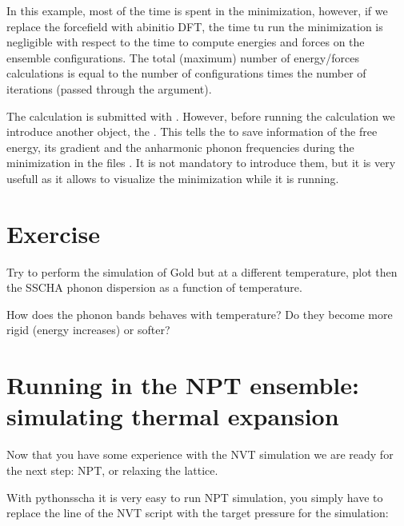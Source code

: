 \documentclass[a4paper,11pt,english]{sphinxmanual}
\begin{document}
\sphinxAtStartPar
In this example, most of the time is spent in the minimization, however, if we replace the force\sphinxhyphen{}field with ab\sphinxhyphen{}initio DFT, the time tu run the minimization is negligible with respect to the time to compute energies and forces on the ensemble configurations.
The total (maximum) number of energy/forces calculations is equal to the number of configurations times the number of iterations (passed through the  argument).

\sphinxAtStartPar
The calculation is submitted with . However, before running the calculation we introduce another object, the .
This tells the  to save information of the free energy, its gradient and the anharmonic phonon frequencies during the minimization in the files . It is not mandatory to introduce them, but it is very usefull as it allows to visualize the minimization while it is running.


\section{Exercise}
\label{\detokenize{start:exercise}}
\sphinxAtStartPar
Try to perform the simulation of Gold but at a different temperature, plot then the SSCHA phonon dispersion as a function of temperature.

\sphinxAtStartPar
How does the phonon bands behaves with temperature? Do they become more rigid (energy increases) or softer?


\section{Running in the NPT ensemble: simulating thermal expansion}
\label{\detokenize{start:running-in-the-npt-ensemble-simulating-thermal-expansion}}
\sphinxAtStartPar
Now that you have some experience with the NVT simulation we are ready for the next step: NPT,
or relaxing the lattice.

\sphinxAtStartPar
With python\sphinxhyphen{}sscha it is very easy to run NPT simulation, you simply have to replace the line of the NVT script with the target pressure for the simulation:

\begin{sphinxVerbatim}[commandchars=\\\{\}]
  
\end{sphinxVerbatim}
\end{document}
